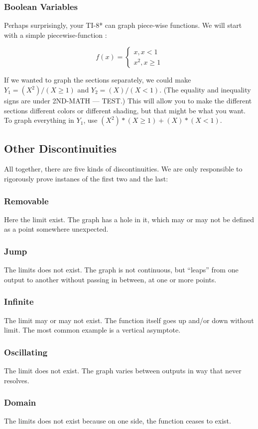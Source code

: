 \subsubsection{Boolean Variables}
Perhaps surprisingly, your TI-8* can graph piece-wise functions.  We will start with a simple
piecewise-function :

$$
f(x)=
\begin{cases}
x, x<1\\
x^2,x\ge 1
\end{cases}
$$



If we wanted to graph the sections separately, we could make $Y_1=(X^2)/(X\ge{}1)$ and
$Y_2=(X)/(X<1)$.  (The equality and inequality signs are under 2ND-MATH --- TEST.)  This will 
allow you to make the different sections different colors or different shading, but that might be
what you want.  To graph everything in $Y_1$, use $(X^2)*(X\ge{}1)+(X)*(X<1)$.



\subsection{Other Discontinuities}


All together, there are five kinds of discontinuities.  We are only responsible to rigorously prove
instanes of the first two and the last:

\subsubsection{Removable}
Here the limit exist.  The graph has a hole in it, which may or may not be defined as a point somewhere unexpected.
\subsubsection{Jump}
The limits does not exist.  The graph is not continuous, but ``leaps'' from one output to another without passing in between, at one or more points.
\subsubsection{Infinite} 
The limit may or may not exist.  The function itself goes up and/or down without limit.  The most common example is a vertical asymptote.
\subsubsection{Oscillating} 
The limit does not exist.  The graph varies between outputs in way that never resolves.
\subsubsection{Domain} 
The limits does not exist because on one side, the function ceases to exist.


